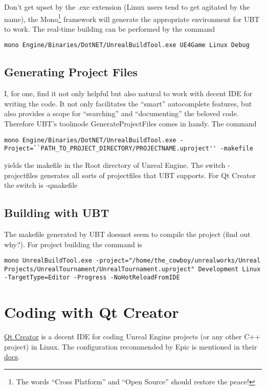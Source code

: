 \documentclass{article}
\begin{document}
Don't get upset by the .exe extension (Linux users tend to get agitated by the name), the Mono\footnote{The words ``Cross Platform'' and ``Open Source'' should restore the peace!} framework will generate the appropriate environment for UBT to work.  The real-time building can be performed by the command
\lstset{language=bash} 
\begin{lstlisting}[frame=single]
 mono Engine/Binaries/DotNET/UnrealBuildTool.exe UE4Game Linux Debug
\end{lstlisting}

\subsection{Generating Project Files}
I, for one, find it not only helpful but also natural to work with decent IDE for writing the code.  It not only facilitates the ``smart'' autocomplete features, but also provides a scope for ``searching'' and ``documenting'' the beloved code.  Therefore UBT's toolmode {\color{mysteel}GenerateProjectFiles} comes in handy.  The command
\lstset{language=bash} 
\begin{lstlisting}[frame=single]
 mono Engine/Binaries/DotNET/UnrealBuildTool.exe -Project=``PATH_TO_PROJECT_DIRECTORY/PROJECTNAME.uproject'' -makefile
\end{lstlisting}
yields the {\color{filecolor}makefile} in the Root directory of Unreal Engine.  The switch -projectfiles generates all sorts of projectfiles that UBT supports.  For Qt Creator the switch is -qmakefile

\subsection{Building with UBT}
The {\color{filecolor}makefile} generated by UBT doesnot seem to compile the project (find out why?).  For project building the command is

\lstset{language=bash} 
\begin{lstlisting}[frame=single]
mono UnrealBuildTool.exe -project="/home/the_cowboy/unrealworks/Unreal Projects/UnrealTournament/UnrealTournament.uproject" Development Linux -TargetType=Editor -Progress -NoHotReloadFromIDE
\end{lstlisting}

\section{Coding with Qt Creator}
\label{sec:cwqt}
\href{https://www.qt.io/}{{\color{Blue}Qt Creator}} is a decent IDE for coding Unreal Engine projects (or any other C++ project) in Linux.  The configuration recommended by Epic is mentioned in their \href{https://docs.unrealengine.com/en-US/Platforms/Linux/BeginnerLinuxDeveloper/SettingUpQtCreator}{{\color{blue}docs}}.
\end{document}
